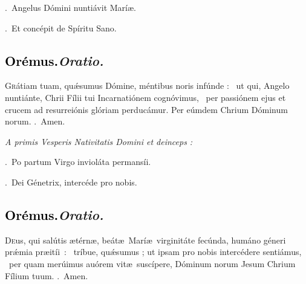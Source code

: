 \documentclass[12pt]{article} %
\newenvironment{rubric}{\vspace{2 mm}\color{benred8} \itshape \leftskip 0in \setlength{\parindent}{0.25in}}{\vspace{2 mm}}
\newenvironment{response}{\leftskip 0in \setlength{\parindent}{0in}}{\vspace{2 mm}}
\let\oldgresixstar\gresixstar
\renewcommand{\gresixstar}{\textcolor{benred8}{\oldgresixstar}}
\let\oldgredagger\gredagger
\renewcommand{\gredagger}{\textcolor{benred8}{\oldgredagger}}
\let\oldVbar\Vbar
\renewcommand{\Vbar}{\textcolor{benred8}{\oldVbar .}}
\let\oldRbar\Rbar
\renewcommand{\Rbar}{\textcolor{benred8}{\oldRbar .}}
\def\capitulumSpace{\hspace{20 mm}}
\begin{document}
\begin{response}
\Vbar\ Angelus D\'{o}mini nunti\'{a}vit Mar\'{i}\ae .

\Rbar\ Et conc\'{e}pit de Sp\'{i}ritu Sano.

\end{response}

\subsection*{\textcolor{black}{Or\'{e}mus.}\capitulumSpace \emph{Oratio.}}

\begin{response}\lettrine{G}{r}\'{a}tiam tuam, qu\'{\ae}sumus D\'{o}mine, m\'{e}ntibus noris inf\'{u}nde : \gredagger\ ut qui, Angelo nunti\'{a}nte, Chrii F\'{i}lii tui Incarnati\'{o}nem cogn\'{o}vimus, \gresixstar\ per passi\'{o}nem ejus et crucem ad resurrei\'{o}nis gl\'{o}riam perduc\'{a}mur. Per e\'{u}mdem Chrium D\'{o}minum norum. \Rbar\ Amen.

\end{response}

\begin{rubric}
A primis Vesperis Nativitatis Domini et deinceps :

\end{rubric}

\begin{response}
\Vbar\ Po partum Virgo inviol\'{a}ta permans\'{i}i.

\Rbar\ Dei G\'{e}netrix, interc\'{e}de pro nobis.

\end{response}

\subsection*{\textcolor{black}{Or\'{e}mus.}\capitulumSpace \emph{Oratio.}}

\begin{response}\lettrine{D}{e}us, qui sal\'{u}tis \ae t\'{e}rn\ae , be\'{a}t\ae\ Mar\'{i}\ae\ virginit\'{a}te fec\'{u}nda, hum\'{a}no g\'{e}neri pr\'{\ae}mia \mbox{pr\ae{}it\'{i}i : \gredagger} tr\'{i}bue, qu\'{\ae}sumus ; ut ipsam pro nobis interc\'{e}dere senti\'{a}mus, \gresixstar\ per quam mer\'{u}imus au\'{o}rem vit\ae\ susc\'{i}pere, D\'{o}minum norum Jesum Chrium F\'{i}lium tuum. \Rbar\ Amen.

\end{response}
\end{document}
